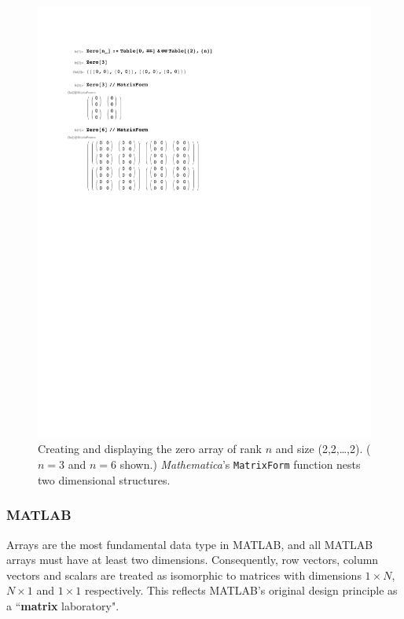 \documentclass[preprint]{sigplanconf}
\newcommand{\MATLAB}{\textsc{MATLAB}}
\newcommand{\Mathematica}{\textit{Mathematica}}
\newcommand{\code}[1]{\texttt{#1}}
\begin{document}
\begin{figure}
  \centering
  \includegraphics[width=\columnwidth]{fig-mathematica/fig.pdf}
  \caption{\label{fig:mathematica} Creating and displaying the zero array of
rank $n$ and size (2,2,\dots,2). ($n=3$ and $n=6$ shown.) \Mathematica's
\code{MatrixForm} function nests two dimensional structures.}
\end{figure}

\subsubsection{MATLAB}

Arrays are the most fundamental data type in \MATLAB{}, and all \MATLAB{}
arrays must have at least two dimensions. Consequently, row vectors, column
vectors and scalars are treated as isomorphic to matrices with dimensions
$1\times N$, $N\times1$ and $1\times1$ respectively. This reflects \MATLAB's
original design principle as a ``\textbf{matrix} laboratory".
\end{document}
